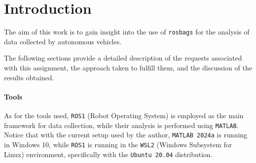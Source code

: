 \section{Introduction}
\label{sec:introduction}

The aim of this work is to gain insight into the use of \texttt{rosbags} for the analysis of data collected by autonomous vehicles.

The following sections provide a detailed description of the requests associated with this assignment, the approach taken to fulfill them, and the discussion of the results obtained.

\paragraph{Tools}

As for the tools used, \texttt{ROS1} (Robot Operating System) is employed as the main framework for data collection, while their analysis is performed using \texttt{MATLAB}.
Notice that with the current setup used by the author, \texttt{MATLAB 2024a} is running in Windows 10, while \texttt{ROS1} is running in the \texttt{WSL2} (Windows Subsystem for Linux) environment, specifically with the \texttt{Ubuntu 20.04} distribution.
